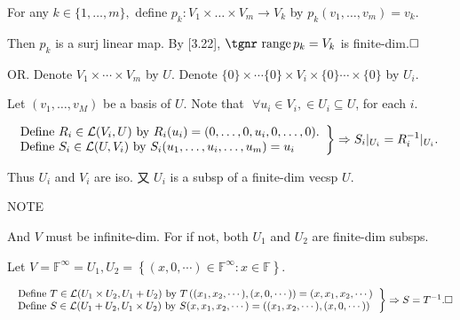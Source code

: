 \documentclass[a4paper, 11pt, UTF8]{article}
\def\range{{\textup{\tgnr range}}\,}
\def\Lm{\mathcal{L}}
\def\Fbb{{\mathbb{F}}}
\def\Or{{\large O{\footnotesize R.} }}
\def\NOTE{\tgnr\large N{\footnotesize OTE}}
\begin{document}
\begin{large}
\SepLine\par

\par\quad
For any $k\in\{1,\dots,m\},$ define $p_k:V_1\times\dots\times V_m\rightarrow V_k$ by $p_k(v_1,\dots,v_m)=v_k.$\par\quad
Then $p_k$ is a surj linear map. By [3.22], $\range p_k=V_k$ is finite-dim.$\hfill\square$\vspace{8pt}\par\quad
\Or Denote $V_1\times\cdots\times V_m$ by $U$. Denote $\{0\}\times\cdots\{0\}\times V_i\times\{0\}\cdots\times\{0\}$ by $U_i$.\par\quad
Let $(v_1,\dots,v_M)$ be a basis of $U$. Note that $\,\,\forall u_i\in V_i,\in U_i\subseteq U$, for each $i$.\vspace{4pt}\par\quad
$\MathRightBrace{l}{$
Define $R_i\in\Lm(V_i,U)$ by $R_i(u_i)=(0,\dots,0,u_i,0,\dots,0).\\ $
Define $S_i\in\Lm(U,V_i)$ by $S_i(u_1,\dots,u_i,\dots,u_m)=u_i$
$}\Rightarrow S_i|_{U_i}=R_i^{-1}|_{U_i}.$\vspace{4pt}\par\quad
Thus $U_i$ and $V_i$ are iso. 又 $U_i$ is a subsp of a finite-dim vecsp $U$. \PfEnd
\SepLine\par

\par\quad
\NOTE{}\par\quad
{\tgsl And $V$ must be infinite-dim. For if not, both $U_1$ and $U_2$ are finite-dim subsps.}\par\quad
Let $V=\Fbb^\infty=U_1,U_2=\left\{(x,0,\cdots)\in\Fbb^\infty:x\in\Fbb\right\}.$\par\quad
$\MathRightBrace{l}{$
Define $T\in\Lm(U_1\times U_2,U_1+U_2)$ by $T\left((x_1,x_2,\cdots),(x,0,\cdots)\right)=(x,x_1,x_2,\cdots)\\ $
Define $S\in\Lm(U_1+U_2,U_1\times U_2)$ by $S(x,x_1,x_2,\cdots)=\left((x_1,x_2,\cdots),(x,0,\cdots)\right)$
$}\Rightarrow S=T^{-1}.\hfill\square$\par\vspace{5pt}
\SepLine\par


\end{large}
\end{document}
